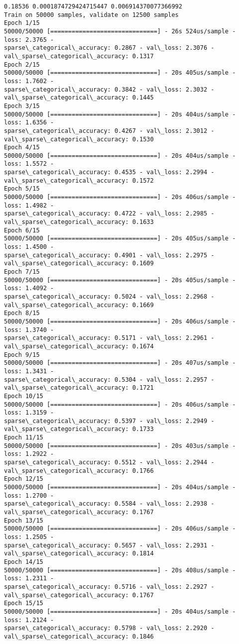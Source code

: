 \documentclass[11pt]{article}
\begin{document}
    \begin{Verbatim}[commandchars=\\\{\}]
0.18536 0.0001874729424715447 0.006914370077366992
Train on 50000 samples, validate on 12500 samples
Epoch 1/15
50000/50000 [==============================] - 26s 524us/sample - loss: 2.3765 -
sparse\_categorical\_accuracy: 0.2867 - val\_loss: 2.3076 -
val\_sparse\_categorical\_accuracy: 0.1317
Epoch 2/15
50000/50000 [==============================] - 20s 405us/sample - loss: 1.7602 -
sparse\_categorical\_accuracy: 0.3842 - val\_loss: 2.3032 -
val\_sparse\_categorical\_accuracy: 0.1445
Epoch 3/15
50000/50000 [==============================] - 20s 404us/sample - loss: 1.6356 -
sparse\_categorical\_accuracy: 0.4267 - val\_loss: 2.3012 -
val\_sparse\_categorical\_accuracy: 0.1530
Epoch 4/15
50000/50000 [==============================] - 20s 404us/sample - loss: 1.5572 -
sparse\_categorical\_accuracy: 0.4535 - val\_loss: 2.2994 -
val\_sparse\_categorical\_accuracy: 0.1572
Epoch 5/15
50000/50000 [==============================] - 20s 406us/sample - loss: 1.4982 -
sparse\_categorical\_accuracy: 0.4722 - val\_loss: 2.2985 -
val\_sparse\_categorical\_accuracy: 0.1633
Epoch 6/15
50000/50000 [==============================] - 20s 405us/sample - loss: 1.4500 -
sparse\_categorical\_accuracy: 0.4901 - val\_loss: 2.2975 -
val\_sparse\_categorical\_accuracy: 0.1609
Epoch 7/15
50000/50000 [==============================] - 20s 405us/sample - loss: 1.4092 -
sparse\_categorical\_accuracy: 0.5024 - val\_loss: 2.2968 -
val\_sparse\_categorical\_accuracy: 0.1669
Epoch 8/15
50000/50000 [==============================] - 20s 406us/sample - loss: 1.3740 -
sparse\_categorical\_accuracy: 0.5171 - val\_loss: 2.2961 -
val\_sparse\_categorical\_accuracy: 0.1674
Epoch 9/15
50000/50000 [==============================] - 20s 407us/sample - loss: 1.3431 -
sparse\_categorical\_accuracy: 0.5304 - val\_loss: 2.2957 -
val\_sparse\_categorical\_accuracy: 0.1721
Epoch 10/15
50000/50000 [==============================] - 20s 406us/sample - loss: 1.3159 -
sparse\_categorical\_accuracy: 0.5397 - val\_loss: 2.2949 -
val\_sparse\_categorical\_accuracy: 0.1733
Epoch 11/15
50000/50000 [==============================] - 20s 403us/sample - loss: 1.2922 -
sparse\_categorical\_accuracy: 0.5512 - val\_loss: 2.2944 -
val\_sparse\_categorical\_accuracy: 0.1766
Epoch 12/15
50000/50000 [==============================] - 20s 404us/sample - loss: 1.2700 -
sparse\_categorical\_accuracy: 0.5584 - val\_loss: 2.2938 -
val\_sparse\_categorical\_accuracy: 0.1767
Epoch 13/15
50000/50000 [==============================] - 20s 406us/sample - loss: 1.2505 -
sparse\_categorical\_accuracy: 0.5657 - val\_loss: 2.2931 -
val\_sparse\_categorical\_accuracy: 0.1814
Epoch 14/15
50000/50000 [==============================] - 20s 408us/sample - loss: 1.2311 -
sparse\_categorical\_accuracy: 0.5716 - val\_loss: 2.2927 -
val\_sparse\_categorical\_accuracy: 0.1767
Epoch 15/15
50000/50000 [==============================] - 20s 404us/sample - loss: 1.2124 -
sparse\_categorical\_accuracy: 0.5798 - val\_loss: 2.2920 -
val\_sparse\_categorical\_accuracy: 0.1846
    \end{Verbatim}
\end{document}
